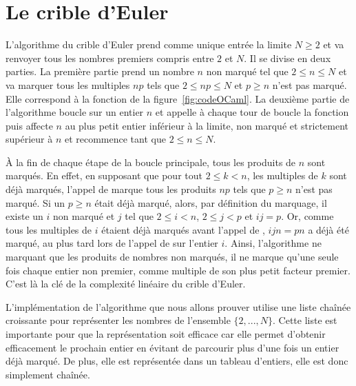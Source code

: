\documentclass[a4paper]{easychair}
\begin{document}
\section{Le crible d'Euler}
\label{sec:algo}

L'algorithme du crible d'Euler prend comme unique entrée la limite $N \geq 2$ et va
renvoyer tous les nombres premiers compris entre $2$ et $N$. Il se divise en
deux parties. La première partie prend un nombre $n$ non marqué
tel que $2 \leq n \leq N$ et va marquer tous les multiples $np$ tels que
$2 \leq np \leq N$ et $p \geq n$ n'est pas marqué. Elle correspond à la fonction
 de la figure~\ref{fig:codeOCaml}.
La deuxième partie de l'algorithme boucle sur un entier $n$ et appelle à chaque
tour de boucle la fonction  puis affecte $n$ au plus
petit entier inférieur à la limite, non marqué et strictement supérieur à $n$
et recommence tant que $2 \leq n \leq N$.

À la fin de chaque étape de la boucle principale, tous les produits de $n$ sont
marqués. En effet, en supposant que pour tout $2 \leq k < n$, les multiples de $k$
sont déjà marqués, l'appel de  marque tous les produits
$np$ tels que $p \geq n$ n'est pas marqué. Si un $p \geq n$ était déjà marqué,
alors, par définition du marquage, il existe un $i$ non marqué et $j$ tel que
$2 \leq i < n$, $2 \leq j < p$ et $ij = p$. Or, comme tous les multiples de $i$
étaient déjà marqués avant l'appel de , $ijn = pn$
a déjà été marqué, au plus tard lors de l'appel de  sur
l'entier $i$.
Ainsi, l'algorithme ne marquant que les produits de nombres non marqués, il ne
marque qu'une seule fois chaque entier non premier, comme multiple de
son plus petit facteur premier. C'est là la clé de la complexité
linéaire du crible d'Euler.


L'implémentation de l'algorithme que nous allons prouver utilise une liste
chaînée croissante pour représenter les nombres de l'ensemble $\{2,...,N\}$.
Cette liste est importante pour que la représentation soit efficace car elle
permet d'obtenir efficacement le prochain entier
en évitant de parcourir plus d'une fois un entier déjà marqué.
De plus, elle est représentée dans un tableau d'entiers, elle est donc
simplement chaînée.
\end{document}
